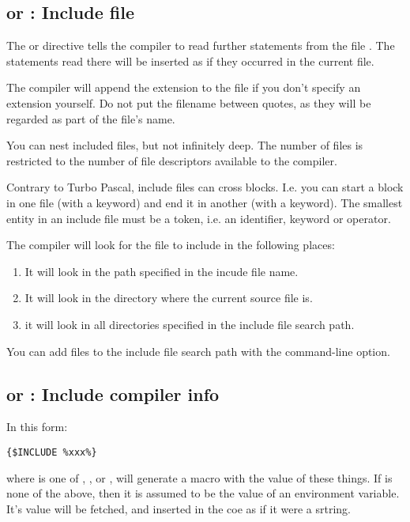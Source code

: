\documentclass{report}
\begin{document}
\subsection{ or  : Include file }
The  or  directive 
tells the compiler to read further statements from the file . 
The statements read there will be inserted as if they occurred in the 
current file.

The compiler will append the  extension to the file if you don't
specify an extension yourself. Do not put the filename between quotes, as
they will be regarded as part of the file's name.

You can nest included files, but not infinitely deep. The number of files is
restricted to the number of file descriptors available to the \fpc compiler.

Contrary to Turbo Pascal, include files can cross blocks. I.e. you can start
a block in one file (with a  keyword) and end it in another (with
a  keyword). The smallest entity in an include file must be a token,
i.e. an identifier, keyword or operator.

The compiler will look for the file to include in the following places:

\begin{enumerate}
\item It will look in the path specified in the incude file name. 
\item It will look in the directory where the current source file is.
\item it will look in all directories specified in the include file search
path.
\end{enumerate}
You can add files to the include file search path with the  
command-line option.

\subsection{ or  : Include compiler info}

In this form:
\begin{verbatim}
{$INCLUDE %xxx%}
\end{verbatim}
where  is one of , ,  or
, will generate a macro with the value of these things.
If  is none of the above, then it is assumed to be the value of
an environment variable. It's value will be fetched, and inserted in the coe
as if it were a srtring.
\end{document}
